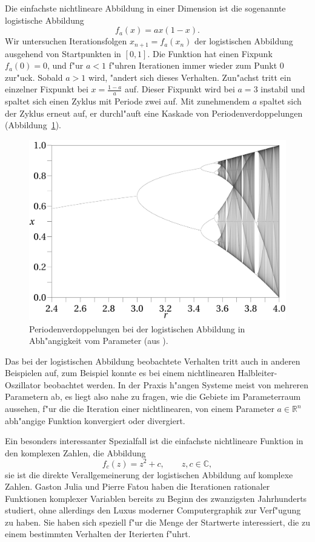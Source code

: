 \begin{refsection}
Die einfachste nichtlineare Abbildung in einer Dimension ist
die sogenannte logistische Abbildung \cite{julia:logistic}
\[
f_a(x)=ax(1-x).
\]
Wir untersuchen Iterationsfolgen $x_{n+1}=f_a(x_n)$ der logistischen Abbildung
ausgehend von Startpunkten in $[0,1]$.
Die Funktion hat einen Fixpunk $f_a(0)=0$, und f"ur $a < 1$ f"uhren Iterationen
immer wieder zum Punkt $0$ zur"uck.
Sobald $a>1$ wird, "andert sich dieses Verhalten.
Zun"achst tritt ein einzelner Fixpunkt bei $x=\frac{1-a}a$ auf.
Dieser Fixpunkt wird bei $a=3$ instabil und spaltet sich einen Zyklus 
mit Periode zwei auf.
Mit zunehmendem $a$ spaltet sich der Zyklus erneut auf, er durchl"auft
eine Kaskade von Periodenverdoppelungen
(Abbildung~\ref{julia:periodenverdoppelung}).
\begin{figure}
\begin{center}
\includegraphics[width=0.7\hsize]{julia/logistic.png}
\end{center}
\caption{Periodenverdoppelungen bei der logistischen Abbildung in
Abh"angigkeit vom Parameter (aus \cite{julia:logistic}).
\label{julia:periodenverdoppelung}}
\end{figure}

Das bei der logistischen Abbildung beobachtete Verhalten tritt auch in
anderen Beispielen auf, zum Beispiel konnte es bei einem nichtlinearen
Halbleiter-Oszillator beobachtet werden.
In der Praxis h"angen Systeme meist von mehreren Parametern ab, es liegt
also nahe zu fragen, wie die Gebiete im Parameterraum aussehen, f"ur
die die Iteration einer nichtlinearen, von einem Parameter $a\in\mathbb R^n$
abh"angige Funktion konvergiert oder divergiert.

Ein besonders interessanter Spezialfall ist die einfachste nichtlineare
Funktion in den komplexen Zahlen, die Abbildung
\[
f_c(z)=z^2 + c,\qquad z,c\in\mathbb C,
\]
sie ist die direkte Verallgemeinerung der logistischen Abbildung auf
komplexe Zahlen.
Gaston Julia und Pierre Fatou haben die Iterationen rationaler 
Funktionen komplexer Variablen bereits zu Beginn des zwanzigsten
Jahrhunderts studiert, ohne allerdings den Luxus moderner Computergraphik
zur Verf"ugung zu haben. Sie haben sich speziell f"ur die Menge der
Startwerte interessiert, die zu einem bestimmten Verhalten der
Iterierten f"uhrt.


\end{refsection}
